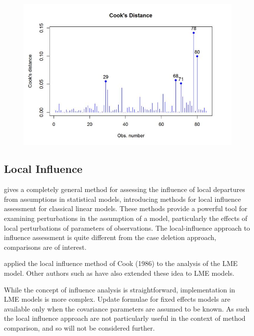 \documentclass[12pt, a4paper]{report}
\theoremstyle{definition}
\theoremstyle{remark}
\begin{document}
\begin{figure}[h!]
\centering
\includegraphics[width=0.9\linewidth]{images/CooksDistancePlot-JS-Roy}
\caption{}
\label{fig:CooksDistancePlot-JS-Roy}
\end{figure}
%



\subsection{Local Influence}
\citet{cook86} gives a completely general method for assessing the influence of local departures from assumptions in statistical models, introducing methods for local influence assessment for classical linear models. These methods provide a powerful tool for examining perturbations in the assumption of a model, particularly the effects of local perturbations of parameters of observations. The local-influence approach to influence assessment is quite different from the case deletion approach, comparisons are of interest.

\citet{Beckman} applied the local influence method of Cook (1986) to the analysis of the LME model.  Other authors such as \citet{lesaffre1998local} have also extended these idea to LME models. 


While the concept of influence analysis is straightforward, implementation in LME models is more complex. Update formulae for fixed effects models are available only when the covariance parameters are assumed to be known. As such the local influence approach are not particularly useful in the context of method comparison, and so will not be considered further.
\end{document}
